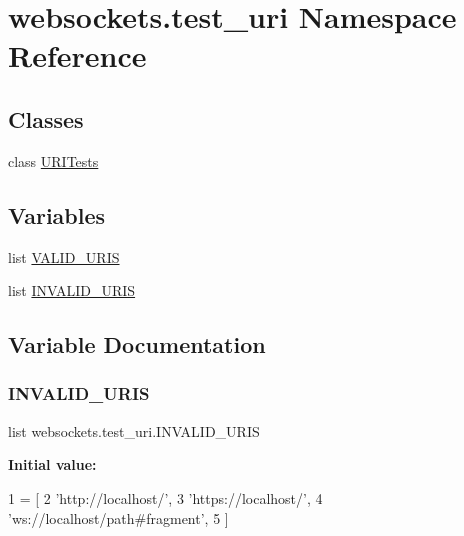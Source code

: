 \hypertarget{namespacewebsockets_1_1test__uri}{}\section{websockets.\+test\+\_\+uri Namespace Reference}
\label{namespacewebsockets_1_1test__uri}
\subsection*{Classes}
\begin{DoxyCompactItemize}
\item 
class \hyperlink{classwebsockets_1_1test__uri_1_1_u_r_i_tests}{U\+R\+I\+Tests}
\end{DoxyCompactItemize}
\subsection*{Variables}
\begin{DoxyCompactItemize}
\item 
list \hyperlink{namespacewebsockets_1_1test__uri_a64a4573cdc520382b48bbdd783a09159}{V\+A\+L\+I\+D\+\_\+\+U\+R\+IS}
\item 
list \hyperlink{namespacewebsockets_1_1test__uri_abe6716efba293ba8bcbe7083569a078f}{I\+N\+V\+A\+L\+I\+D\+\_\+\+U\+R\+IS}
\end{DoxyCompactItemize}


\subsection{Variable Documentation}
\mbox{\label{namespacewebsockets_1_1test__uri_abe6716efba293ba8bcbe7083569a078f}} 
\subsubsection{\texorpdfstring{I\+N\+V\+A\+L\+I\+D\+\_\+\+U\+R\+IS}{INVALID\_URIS}}
{\footnotesize\ttfamily list websockets.\+test\+\_\+uri.\+I\+N\+V\+A\+L\+I\+D\+\_\+\+U\+R\+IS}

{\bfseries Initial value\+:}
\begin{DoxyCode}
1 =  [
2     \textcolor{stringliteral}{'http://localhost/'},
3     \textcolor{stringliteral}{'https://localhost/'},
4     \textcolor{stringliteral}{'ws://localhost/path#fragment'},
5 ]
\end{DoxyCode}
\mbox{\label{namespacewebsockets_1_1test__uri_a64a4573cdc520382b48bbdd783a09159}} 
